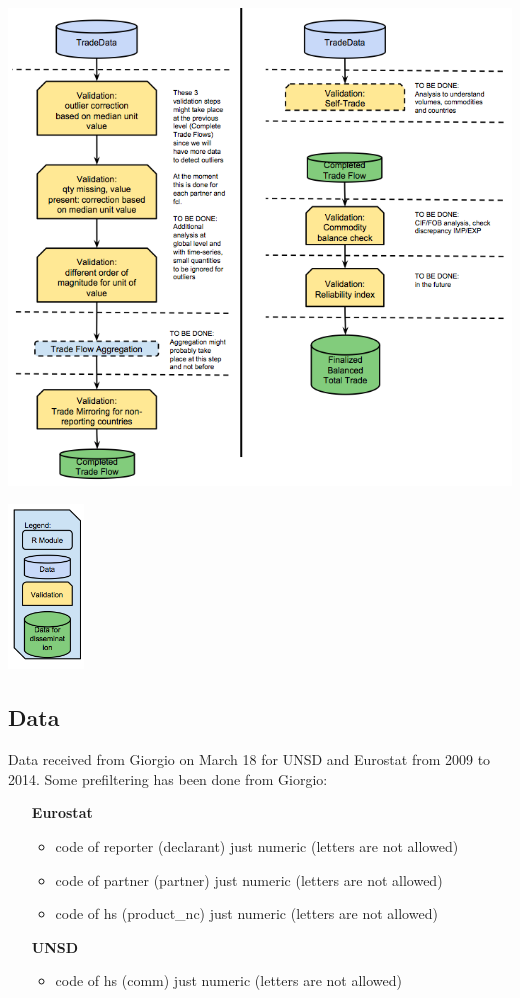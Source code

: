 \documentclass[nojss]{jss}\usepackage[]{graphicx}\usepackage[]{color}
\begin{document}
\newpage
\begin{center}\includegraphics{"trade_4"}\end{center}
\begin{center}\includegraphics[width=20mm,scale=0.1]{"trade_legend"}\end{center}


\subsection{Data}
Data received from Giorgio on March 18 for UNSD and Eurostat from 2009 to 2014.
Some prefiltering has been done from Giorgio:
\begin{itemize}
\item [\bf{Eurostat}]
\begin{itemize}
\item code of reporter (declarant) just numeric (letters are not allowed)
\item code of partner (partner) just numeric (letters are not allowed)
\item code of hs (product\_nc) just numeric (letters are not allowed)
\end{itemize}
\item [\bf{UNSD}]
\begin{itemize}
\item code of hs (comm) just numeric (letters are not allowed)
\end{itemize}
\end{itemize}
\end{document}
